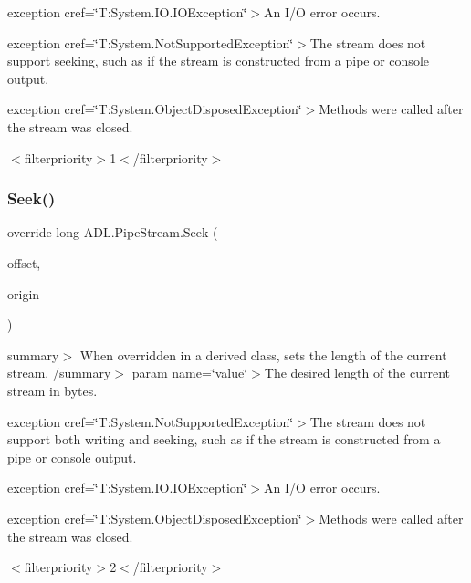 exception cref=\char`\"{}\+T\+:\+System.\+I\+O.\+I\+O\+Exception\char`\"{}$>$An I/O error occurs. 

exception cref=\char`\"{}\+T\+:\+System.\+Not\+Supported\+Exception\char`\"{}$>$The stream does not support seeking, such as if the stream is constructed from a pipe or console output. 

exception cref=\char`\"{}\+T\+:\+System.\+Object\+Disposed\+Exception\char`\"{}$>$Methods were called after the stream was closed. 

$<$filterpriority$>$1$<$/filterpriority$>$ \mbox{\label{class_a_d_l_1_1_pipe_stream_ae34adb2842a65053e2e13dcb15fe65e5}} 
\subsubsection{\texorpdfstring{Seek()}{Seek()}}
{\footnotesize\ttfamily override long A\+D\+L.\+Pipe\+Stream.\+Seek (\begin{DoxyParamCaption}\item[{long}]{offset,  }\item[{Seek\+Origin}]{origin }\end{DoxyParamCaption})}

summary$>$ When overridden in a derived class, sets the length of the current stream. /summary$>$ param name=\char`\"{}value\char`\"{}$>$The desired length of the current stream in bytes. 

exception cref=\char`\"{}\+T\+:\+System.\+Not\+Supported\+Exception\char`\"{}$>$The stream does not support both writing and seeking, such as if the stream is constructed from a pipe or console output. 

exception cref=\char`\"{}\+T\+:\+System.\+I\+O.\+I\+O\+Exception\char`\"{}$>$An I/O error occurs. 

exception cref=\char`\"{}\+T\+:\+System.\+Object\+Disposed\+Exception\char`\"{}$>$Methods were called after the stream was closed. 

$<$filterpriority$>$2$<$/filterpriority$>$ \mbox{\label{class_a_d_l_1_1_pipe_stream_a66a10533676de87061ae89c0ab2c62c5}} 
